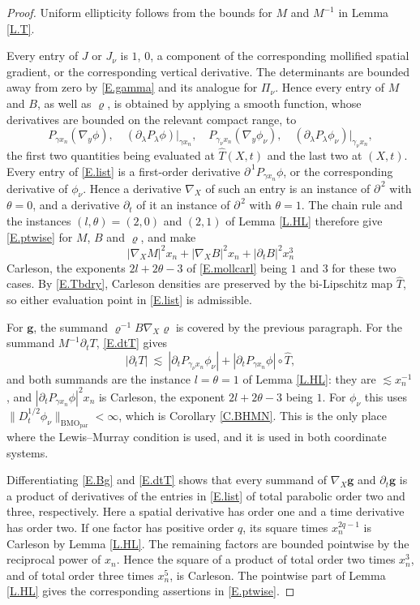 \documentclass[12pt,leqno]{amsart}
\numberwithin{equation}{section}
\newcommand{\abs}[1]{\left\vert#1\right\vert}
\newcommand{\br}[1]{\left(#1\right)}
\newcommand{\pd}{\partial}
\newcommand{\dhalf}{D_t^{1/2}}
\newcommand{\BMOpar}{\mathrm{BMO}_{\mathrm{par}}}
\theoremstyle{plain}
\theoremstyle{remark}
\begin{document}
\begin{proof}
Uniform ellipticity follows from the bounds for $M$ and $M^{-1}$ in
Lemma \ref{L.T}.

Every entry of $J$ or $J_\nu$ is $1$, $0$, a component of the corresponding
mollified spatial gradient, or the corresponding vertical derivative. The
determinants are bounded away from zero by \eqref{E.gamma} and its analogue
for $\Pi_\nu$. Hence every entry
of $M$ and $B$, as well as $\varrho$, is obtained by applying a smooth
function, whose derivatives are bounded on the relevant compact range, to
\begin{equation}\label{E.list}
  P_{\gamma x_n}\br{\nabla_y\phi},\quad
  \br{\pd_\lambda P_\lambda\phi}\big|_{\gamma x_n},\quad
  P_{\gamma_\nu x_n}\br{\nabla_y\phi_\nu},\quad
  \br{\pd_\lambda P_\lambda\phi_\nu}\big|_{\gamma_\nu x_n} ,
\end{equation}
the first two quantities being evaluated at $\widehat T(X,t)$ and the last two
at $(X,t)$. Every entry of \eqref{E.list} is a first-order derivative
$\pd^{\,1}P_{\gamma x_n}\phi$, or the corresponding derivative of
$\phi_\nu$. Hence a derivative $\nabla_X$ of such an entry is an
instance of $\pd^{\,2}$ with $\theta=0$, and a derivative $\pd_t$ of it an
instance of $\pd^{\,2}$ with $\theta=1$. The chain rule and the instances
$(l,\theta)=(2,0)$ and $(2,1)$ of Lemma \ref{L.HL} therefore give
\eqref{E.ptwise} for $M$, $B$ and $\varrho$, and make
$$\abs{\nabla_XM}^2x_n+\abs{\nabla_XB}^2x_n
  +\abs{\pd_tB}^2x_n^3$$
Carleson, the exponents $2l+2\theta-3$ of \eqref{E.mollcarl} being $1$ and $3$
for these two cases. By \eqref{E.Tbdry}, Carleson densities are preserved by
the bi-Lipschitz map $\widehat T$, so either evaluation point in
\eqref{E.list} is admissible.\medskip

For $\mathbf g$, the summand $\varrho^{-1}B\nabla_X\varrho$ is covered by the
previous paragraph. For the summand $M^{-1}\pd_tT$, \eqref{E.dtT} gives
$$\abs{\pd_tT}\ \lesssim\ \abs{\pd_tP_{\gamma_\nu x_n}\phi_\nu}
  +\abs{\pd_tP_{\gamma x_n}\phi}\circ\widehat T ,$$
and both summands are the instance $l=\theta=1$ of Lemma \ref{L.HL}: they are
$\lesssim x_n^{-1}$, and $\abs{\pd_tP_{\gamma x_n}\phi}^2x_n$ is Carleson, the
exponent $2l+2\theta-3$ being $1$. For $\phi_\nu$ this uses
$\|\dhalf\phi_\nu\|_{\BMOpar}<\infty$, which is Corollary \ref{C.BHMN}. This is
the only place where the Lewis--Murray condition is used, and it is used in both
coordinate systems.\medskip

Differentiating \eqref{E.Bg} and \eqref{E.dtT} shows that every summand of
$\nabla_X\mathbf g$ and $\pd_t\mathbf g$ is a product of derivatives of the
entries in \eqref{E.list} of total parabolic order two and three,
respectively. Here a spatial derivative has order one and a time derivative
has order two. If one factor has positive order $q$, its square times
$x_n^{2q-1}$ is Carleson by Lemma \ref{L.HL}. The remaining factors are
bounded pointwise by the reciprocal power of $x_n$. Hence the square of a
product of total order two times $x_n^3$, and of total order three times
$x_n^5$, is Carleson. The pointwise part of Lemma \ref{L.HL} gives the
corresponding assertions in \eqref{E.ptwise}.


\end{proof}
\end{document}
